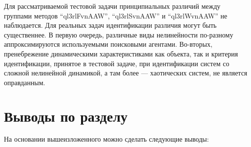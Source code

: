 Для рассматриваемой тестовой задачи принципиальных различий
между группами методов
``ql3rlFvnAAW'', ``ql3rlSvnAAW'' и ``ql3rlWvnAAW''
не наблюдается. Для реальных задач идентификации
различия могут быть существеннее.
В первую очередь, различные виды нелинейности
по-разному аппроксимируются используемыми поисковыми агентами.
Во-вторых, пренебрежение динамическими характеристиками
как объекта, так и критерия идентификации, принятое
в тестовой задаче, при идентификации систем со сложной нелинейной динамикой,
а там более --- хаотических систем, не является оправданным.








\section{Выводы по разделу \thechapter} %

На основании вышеизложенного можно сделать следующие выводы:

